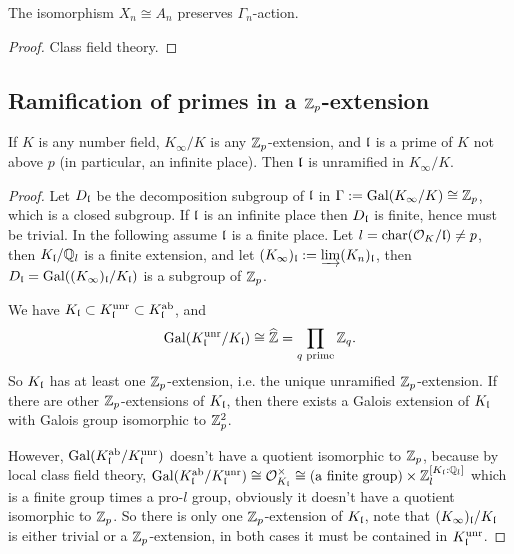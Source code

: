 \begin{prop}
\label{Xn-isom-An-equivariant}
The isomorphism $X_n\cong A_n$ preserves $\Gamma_n$-action.
\end{prop}

\begin{proof}
Class field theory.
\end{proof}

\subsection{Ramification of primes in a ${\mathbb {Z}}_p$-extension}

\begin{prop}
\label{p:unr-outside-p}
\leanok
If $K$ is any number field, $K_\infty/K$ is any ${\mathbb {Z}}_p$-extension,
and ${\mathfrak{l}}$ is a prime of $K$ not above $p$
(in particular, an infinite place).
Then ${\mathfrak{l}}$ is unramified in $K_\infty/K$.
\end{prop}

\begin{proof}
\leanok
Let $D_{\mathfrak{l}}$ be the decomposition subgroup of ${\mathfrak{l}}$ in $\Gamma:={\mathrm{Gal}}(K_\infty/K)\cong{\mathbb {Z}}_p$,
which is a closed subgroup.
If ${\mathfrak{l}}$ is an infinite place then $D_{\mathfrak{l}}$ is finite, hence must be trivial.
In the following assume ${\mathfrak{l}}$ is a finite place.
Let $l=\operatorname{char}({\mathcal {O}}_K/{\mathfrak{l}})\neq p$, then $K_{\mathfrak{l}}/{\mathbb {Q}}_l$ is a finite extension,
and let $(K_\infty)_{\mathfrak{l}}:=\varinjlim(K_n)_{\mathfrak{l}}$, then
$D_{\mathfrak{l}}={\mathrm{Gal}}((K_\infty)_{\mathfrak{l}}/K_{\mathfrak{l}})$ is a subgroup of ${\mathbb {Z}}_p$.

We have $K_{\mathfrak{l}}\subset K_{\mathfrak{l}}^{\mathrm{unr}}\subset K_{\mathfrak{l}}^{\mathrm{ab}}$,
and
$$
{\mathrm{Gal}}(K_{\mathfrak{l}}^{\mathrm{unr}}/K_{\mathfrak{l}})\cong\widehat{{\mathbb {Z}}}
=\prod_{q\text{ prime}}{\mathbb {Z}}_q.
$$
So $K_{\mathfrak{l}}$ has at least one ${\mathbb {Z}}_p$-extension, i.e. the unique unramified
${\mathbb {Z}}_p$-extension. If there are other ${\mathbb {Z}}_p$-extensions of $K_{\mathfrak{l}}$,
then there exists a Galois extension of $K_{\mathfrak{l}}$ with Galois group
isomorphic to ${\mathbb {Z}}_p^2$.

However, ${\mathrm{Gal}}(K_{\mathfrak{l}}^{\mathrm{ab}}/K_{\mathfrak{l}}^{\mathrm{unr}})$
doesn't have a quotient isomorphic to ${\mathbb {Z}}_p$, because by
local class field theory,
${\mathrm{Gal}}(K_{\mathfrak{l}}^{\mathrm{ab}}/K_{\mathfrak{l}}^{\mathrm{unr}})\cong{\mathcal {O}}_{K_{\mathfrak{l}}}^\times\cong
(\text{a finite group})\times{\mathbb {Z}}_l^{[K_{\mathfrak{l}}:{\mathbb {Q}}_l]}$ which is a finite group
times a pro-$l$ group, obviously it doesn't have a quotient isomorphic to ${\mathbb {Z}}_p$.
So there is only one ${\mathbb {Z}}_p$-extension of $K_{\mathfrak{l}}$,
note that $(K_\infty)_{\mathfrak{l}}/K_{\mathfrak{l}}$ is either trivial or a ${\mathbb {Z}}_p$-extension,
in both cases it must be contained in $K_{\mathfrak{l}}^{\mathrm{unr}}$.
\end{proof}

